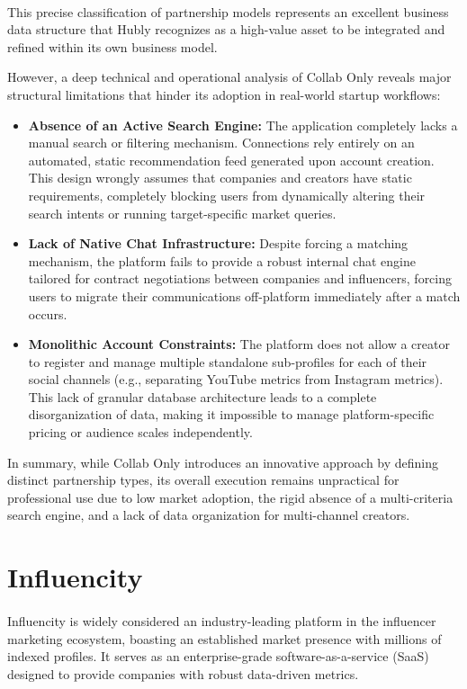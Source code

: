 \paragraph{}This precise classification of partnership models represents an excellent business data structure that Hubly recognizes as a high-value asset to be integrated and refined within its own business model.

However, a deep technical and operational analysis of Collab Only reveals major structural limitations that hinder its adoption in real-world startup workflows:
\begin{itemize}
    \item \textbf{Absence of an Active Search Engine:} The application completely lacks a manual search or filtering mechanism. Connections rely entirely on an automated, static recommendation feed generated upon account creation. This design wrongly assumes that companies and creators have static requirements, completely blocking users from dynamically altering their search intents or running target-specific market queries.
    \item \textbf{Lack of Native Chat Infrastructure:} Despite forcing a matching mechanism, the platform fails to provide a robust internal chat engine tailored for contract negotiations between companies and influencers, forcing users to migrate their communications off-platform immediately after a match occurs.
    \item \textbf{Monolithic Account Constraints:} The platform does not allow a creator to register and manage multiple standalone sub-profiles for each of their social channels (e.g., separating YouTube metrics from Instagram metrics). This lack of granular database architecture leads to a complete disorganization of data, making it impossible to manage platform-specific pricing or audience scales independently.
\end{itemize}

In summary, while Collab Only introduces an innovative approach by defining distinct partnership types, its overall execution remains unpractical for professional use due to low market adoption, the rigid absence of a multi-criteria search engine, and a lack of data organization for multi-channel creators. 

\section{Influencity}
\label{sec:influencity}
\paragraph{}Influencity is widely considered an industry-leading platform in the influencer marketing ecosystem, boasting an established market presence with millions of indexed profiles. It serves as an enterprise-grade software-as-a-service (SaaS) designed to provide companies with robust data-driven metrics. 

